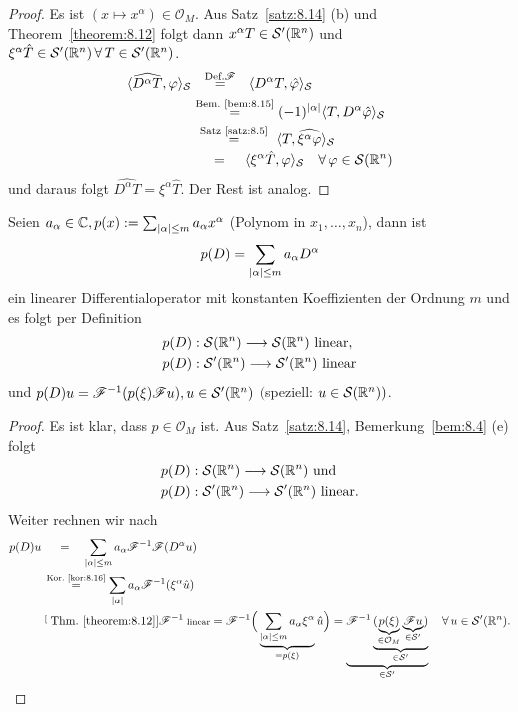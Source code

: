 \begin{proof}
Es ist $(x \mapsto x^\alpha) \in \mathcal O_M$. Aus Satz~\ref{satz:8.14} (b) und Theorem~\ref{theorem:8.12} folgt dann $x^\alpha T \in \mathcal S'(\mathbb{R}^n)$ und $\xi^\alpha \hat T \in \mathcal S'(\mathbb{R}^n) \, \forall \, T \in \mathcal S'(\mathbb{R}^n)$.
\begin{align*}
	\< \widehat{D^\alpha T}, \varphi\>_{\mathcal S} &\ \  \stackrel{\scriptsize\text{Def.} \F}= \, \, \, \, \<D^\alpha T, \hat \varphi \>_{\mathcal S} \\
	& \stackrel{\scriptsize\text{Bem.}~\ref{bem:8.15}}= (-1)^{\abs\alpha} \< T, D^\alpha \hat \varphi\>_{\mathcal S} \\
	&\, \,  \stackrel{\scriptsize\text{Satz}~\ref{satz:8.5}}= \, \, \<T,\widehat{\xi^\alpha \varphi}\>_{\mathcal S} \\
	& \ \ \ \ =\quad\, \< \xi^\alpha \hat T, \varphi \>_{\mathcal S} \quad \fa \, \varphi \in \mathcal S(\R^n) 
\end{align*}
und daraus folgt $\widehat{D^\alpha T} = \xi^\alpha \hat T$. Der Rest ist analog.
\end{proof}

\begin{theorem}
\label{theorem:8.17}
Seien $a_\alpha \in \mathbb{C}, p(x):= \sum_{\lvert \alpha\rvert \leq m} a_\alpha x^\alpha$ (Polynom in $x_1,\ldots, x_n$), dann ist
\[
	p(D)= \sum_{\lvert \alpha\rvert \leq m} a_\alpha D^\alpha
\]
ein linearer Differentialoperator mit konstanten Koeffizienten der Ordnung $m$ und es folgt per Definition
\[
	\begin{aligned}
		&p(D):\mathcal S(\mathbb{R}^n) \longrightarrow \mathcal S(\mathbb{R}^n) \text{ linear}, \\
		&p(D):\mathcal S'(\mathbb{R}^n) \longrightarrow \mathcal S'(\mathbb{R}^n) \text{ linear}
	\end{aligned}
\]
und $p(D) u = \mathscr{F}^{-1} (p(\xi) \mathscr{F} u), u \in \mathcal S'(\mathbb{R}^n)$ $($speziell: $u \in \mathcal S(\mathbb{R}^n))$.
\end{theorem}

\begin{proof}
Es ist klar, dass $p \in \mathcal O_M$ ist. Aus Satz~\ref{satz:8.14}, Bemerkung~\ref{bem:8.4} (e) folgt
\[
	\begin{aligned}
		&p(D):\mathcal S(\mathbb{R}^n) \longrightarrow \mathcal S(\mathbb{R}^n) \text{ und} \\
		&p(D):\mathcal S'(\mathbb{R}^n) \longrightarrow \mathcal S'(\mathbb{R}^n) \text{ linear}.
	\end{aligned}
\]
Weiter rechnen wir nach
\begin{align*}
	p(D) u & \quad \ = \quad \sum_{\lvert \alpha\rvert \leq m} a_\alpha \mathscr{F}^{-1} \mathscr{F} (D^\alpha u) \\
	&\,  \stackrel{\scriptsize\text{Kor.}~\ref{kor:8.16}}= \sum_{\lvert \alpha\rvert} a_\alpha \mathscr{F}^{-1} (\xi^\alpha\hat u) \\
	& \stackrel[\scriptsize\text{Thm.}~\ref{theorem:8.12}]{\scriptsize\mathscr{F}^{-1}\text{ linear}}= \mathscr{F}^{-1} \Big(\underbrace{\sum_{\lvert \alpha\rvert\leq m} a_\alpha \xi^\alpha}_{=p(\xi)} \hat u \Big) = \underbrace{\mathscr{F}^{-1} \underbrace{(\underbrace{p(\xi)}_{\in \mathcal O_M} \underbrace{\mathscr{F} u}_{\in \mathcal S'})}_{\in \mathcal S'}}_{\in \mathcal S'}  \quad \forall \, u \in \mathcal S'(\mathbb{R}^n) .
\end{align*}
\end{proof}

